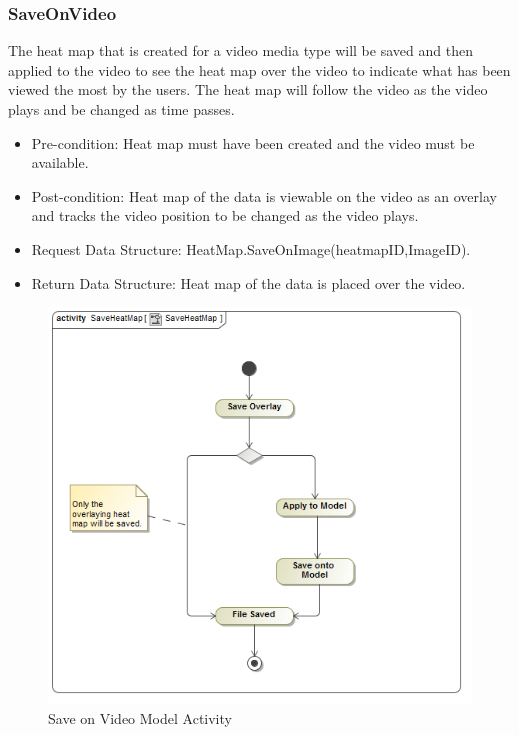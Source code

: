 	\subsubsection{SaveOnVideo}
	The heat map that is created for a video media type will be saved and then applied to the video to see the heat map over the video to indicate what has been viewed the most by the users. The heat map will follow the video as the video plays and be changed as time passes.
	\begin{itemize}
		\item Pre-condition: Heat map must have been created and the video must be available.
		\item Post-condition: Heat map of the data is viewable on the video as an overlay and tracks the video position to be changed as the video plays.
		\item Request Data Structure: HeatMap.SaveOnImage(heatmapID,ImageID).
		\item Return Data Structure: Heat map of the data is placed over the video.
	\end{itemize}
	\begin{figure}[!ht]
		\centering	
		\includegraphics[scale=0.5]{Diagrams/Activity_Diagram__SaveHeatMap__SaveHeatMap.png}	
		\caption{Save on Video Model Activity}
	\end{figure}

